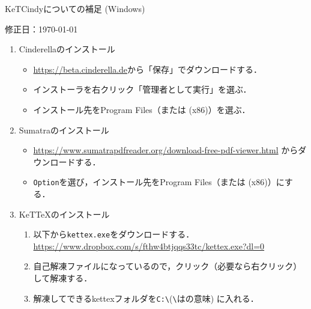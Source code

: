 \documentclass{ujarticle}
\begin{document}
\begin{center}
KeTCindyについての補足 (Windows)
\end{center}

\hfill 修正日：\today

\begin{enumerate}[\bf\large 1.]

\item Cinderellaのインストール
\begin{itemize}
\item \url{https://beta.cinderella.de}から「保存」でダウンロードする．
\item インストーラを右クリック「管理者として実行」を選ぶ．
\item インストール先をProgram Files（または (x86)）を選ぶ．
\end{itemize}

\item Sumatraのインストール
\begin{itemize}
\item \url{https://www.sumatrapdfreader.org/download-free-pdf-viewer.html} からダウンロードする．
\item \verb|Option|を選び，インストール先をProgram Files（または (x86)）にする．
\end{itemize}

\item KeTTeXのインストール

\begin{enumerate}[(1)]
\item 以下から\verb|kettex.exe|をダウンロードする．\\
    \hspace*{10mm}\url{https://www.dropbox.com/s/fthw4btjqqs33tc/kettex.exe?dl=0}
\item 自己解凍ファイルになっているので，クリック（必要なら右クリック）して解凍する．
\item 解凍してできるkettexフォルダを\verb|C:\|(\verb|\|は\yen の意味) に入れる．
\end{enumerate}


\end{enumerate}
\end{document}
